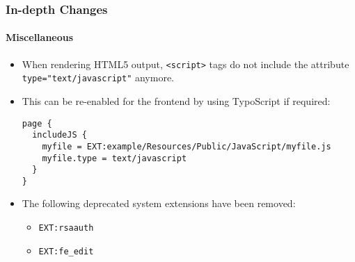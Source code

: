 \begin{frame}[fragile]
	\frametitle{In-depth Changes}
	\framesubtitle{Miscellaneous}

	\lstset{basicstyle=\tiny\ttfamily}

	\begin{itemize}

		\item When rendering HTML5 output, \texttt{<script>} tags do not include
			the attribute \texttt{type="text/javascript"} anymore.

		\item This can be re-enabled for the frontend by using TypoScript if required:
\begin{lstlisting}
page {
  includeJS {
    myfile = EXT:example/Resources/Public/JavaScript/myfile.js
    myfile.type = text/javascript
  }
}
\end{lstlisting}

		\item The following deprecated system extensions have been removed:

			\begin{itemize}
				\item \texttt{EXT:rsaauth}
				\item \texttt{EXT:fe\_edit}
			\end{itemize}

	\end{itemize}

\end{frame}


